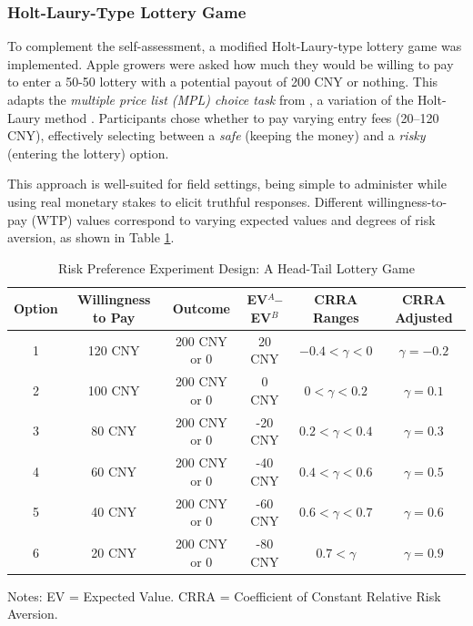 \subsubsection{Holt-Laury-Type Lottery Game}  
\noindent To complement the self-assessment, a modified Holt-Laury-type lottery game was implemented. Apple growers were asked how much they would be willing to pay to enter a 50-50 lottery with a potential payout of 200 CNY or nothing. This adapts the \textit{multiple price list (MPL) choice task} from \cite{brick2012risk}, a variation of the Holt-Laury method \citep{holt2002risk}. Participants chose whether to pay varying entry fees (20–120 CNY), effectively selecting between a \textit{safe} (keeping the money) and a \textit{risky} (entering the lottery) option.  

This approach is well-suited for field settings, being simple to administer while using real monetary stakes to elicit truthful responses. Different willingness-to-pay (WTP) values correspond to varying expected values and degrees of risk aversion, as shown in Table \ref{tab:experiment_design}.  

\begin{table}[H]
    \centering
    \footnotesize 
    \caption{Risk Preference Experiment Design: A Head-Tail Lottery Game}
    \renewcommand{\arraystretch}{1.2}
    \begin{tabular}{cccccc}
        \toprule
        \textbf{Option} & \textbf{Willingness to Pay} & \textbf{Outcome} & \textbf{EV$^{A}$--EV$^{B}$} & \textbf{CRRA Ranges} & \textbf{CRRA Adjusted}\\
        \midrule
        1 & 120 CNY & 200 CNY or 0 & 20 CNY & $-0.4 < \gamma < 0$  & $\gamma = -0.2$\\
        2 & 100 CNY & 200 CNY or 0 & 0 CNY & $0 < \gamma < 0.2$  & $\gamma= 0.1$ \\
        3 & 80 CNY & 200 CNY or 0 & -20 CNY & $0.2 < \gamma < 0.4$  & $\gamma= 0.3$ \\
        4 & 60 CNY & 200 CNY or 0 & -40 CNY & $0.4 < \gamma < 0.6$  & $\gamma= 0.5$ \\
        5 & 40 CNY & 200 CNY or 0 & -60 CNY & $0.6 < \gamma < 0.7$  & $\gamma=0.6$ \\
        6 & 20 CNY & 200 CNY or 0 & -80 CNY & $0.7 < \gamma$  & $\gamma= 0.9$ \\
        \bottomrule
    \end{tabular}
    \label{tab:experiment_design}
    \vspace{0.5em}
    \small Notes: EV = Expected Value. CRRA = Coefficient of Constant Relative Risk Aversion.
\end{table}

